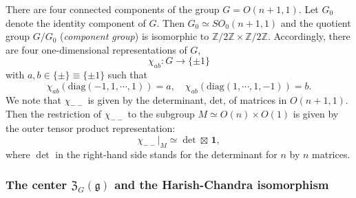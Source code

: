 There are four connected components
 of the group $G=O(n+1,1)$.  
Let 
$G_0$ denote the identity component of $G$.  
Then $G_0\simeq SO_0(n+1,1)$ and the quotient group $G/G_0$
({\it{component group}})
 is isomorphic
 to ${\mathbb{Z}}/2 {\mathbb{Z}} \times {\mathbb{Z}}/2 {\mathbb{Z}}$.  
Accordingly, there are four one-dimensional representations of $G$, 
\begin{equation}
\label{eqn:chiab}
\chi_{ab}\colon  G\to\{\pm1\}
\end{equation}
with $a,b\in\{\pm\}\equiv\{\pm1\}$ such that
\begin{equation*}
\chi_{ab}\left(\mathrm{diag}(-1,1,\cdots,1)\right)=a,\quad 
\chi_{ab}\left(\mathrm{diag}(1,\cdots,1,-1)\right)=b.
\end{equation*}
We note that $\chi_{--}$ is given 
 by the determinant, 
 $\mathrm{det}$, 
 of matrices in $O(n+1,1)$. 
Then the restriction of 
$\chi_{--}$ to the subgroup $M\simeq O(n) \times O(1)$ is given by the outer tensor product representation:
\begin{equation}\label{eqn:chiM}
\chi_{--}\vert_{M}\simeq \det\boxtimes \,\mathbf{1},  
\end{equation}
where $\det$ in the right-hand side
 stands for the determinant
 for $n$ by $n$ matrices.  


\subsubsection{The center ${\mathfrak{Z}}_G({\mathfrak{g}})$ 
 and the Harish-Chandra isomorphism}
\label{subsec:2.1.4}


